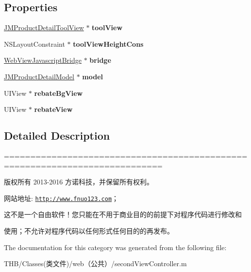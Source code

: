 \subsection*{Properties}
\begin{DoxyCompactItemize}
\item 
\mbox{\label{categorysecond_view_controller_07_08_a1a08a5b2528bf56ffe4e9f2170089593}} 
\mbox{\hyperlink{interface_j_m_product_detail_tool_view}{J\+M\+Product\+Detail\+Tool\+View}} $\ast$ {\bfseries tool\+View}
\item 
\mbox{\label{categorysecond_view_controller_07_08_ada591d0e9177283f7d2f40a404570e4a}} 
N\+S\+Layout\+Constraint $\ast$ {\bfseries tool\+View\+Height\+Cons}
\item 
\mbox{\label{categorysecond_view_controller_07_08_a3e317d1f09cb337c4911f79332e4e660}} 
\mbox{\hyperlink{interface_web_view_javascript_bridge}{Web\+View\+Javascript\+Bridge}} $\ast$ {\bfseries bridge}
\item 
\mbox{\label{categorysecond_view_controller_07_08_a09d19757f1d0bb7ec8c8d17579ba2a04}} 
\mbox{\hyperlink{interface_j_m_product_detail_model}{J\+M\+Product\+Detail\+Model}} $\ast$ {\bfseries model}
\item 
\mbox{\label{categorysecond_view_controller_07_08_af223da962b897b0b5fac759831132f68}} 
U\+I\+View $\ast$ {\bfseries rebate\+Bg\+View}
\item 
\mbox{\label{categorysecond_view_controller_07_08_aed2cf81ccb6f28d3dfe5e47dcfa1110a}} 
U\+I\+View $\ast$ {\bfseries rebate\+View}
\end{DoxyCompactItemize}


\subsection{Detailed Description}
============================================================================

版权所有 2013-\/2016 方诺科技，并保留所有权利。

网站地址\+: \href{http://www.fnuo123.com}{\tt http\+://www.\+fnuo123.\+com}； 



这不是一个自由软件！您只能在不用于商业目的的前提下对程序代码进行修改和

使用；不允许对程序代码以任何形式任何目的的再发布。 

 

The documentation for this category was generated from the following file\+:\begin{DoxyCompactItemize}
\item 
T\+H\+B/\+Classes(类文件)/web（公共）/second\+View\+Controller.\+m\end{DoxyCompactItemize}
